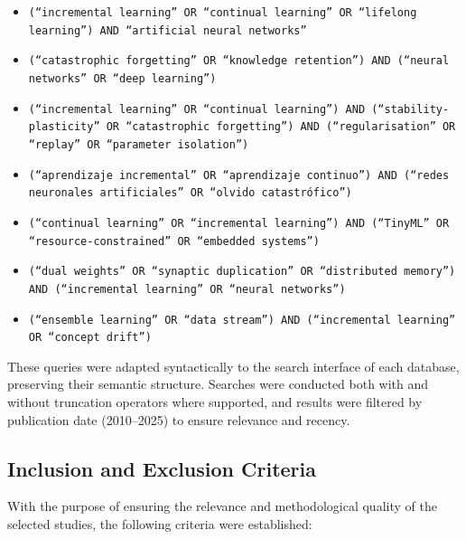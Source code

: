 \begin{itemize}
    \item \texttt{(``incremental learning'' OR ``continual learning'' OR ``lifelong 
    learning'') AND ``artificial neural networks''}
    
    \item \texttt{(``catastrophic forgetting'' OR ``knowledge retention'') AND 
    (``neural networks'' OR ``deep learning'')}
    
    \item \texttt{(``incremental learning'' OR ``continual learning'') AND 
    (``stability-plasticity'' OR ``catastrophic forgetting'') AND 
    (``regularisation'' OR ``replay'' OR ``parameter isolation'')}
    
    \item \texttt{(``aprendizaje incremental'' OR ``aprendizaje continuo'') AND 
    (``redes neuronales artificiales'' OR ``olvido catastr\'ofico'')}
    
    \item \texttt{(``continual learning'' OR ``incremental learning'') AND 
    (``TinyML'' OR ``resource-constrained'' OR ``embedded systems'')}
    
    \item \texttt{(``dual weights'' OR ``synaptic duplication'' OR ``distributed 
    memory'') AND (``incremental learning'' OR ``neural networks'')}
    
    \item \texttt{(``ensemble learning'' OR ``data stream'') AND 
    (``incremental learning'' OR ``concept drift'')}
\end{itemize}

\noindent These queries were adapted syntactically to the search interface of each 
database, preserving their semantic structure. Searches were conducted both with and 
without truncation operators where supported, and results were filtered by publication 
date (2010--2025) to ensure relevance and recency.

\subsection{Inclusion and Exclusion Criteria}
With the purpose of ensuring the relevance and methodological quality of the selected studies, the following criteria were established:

